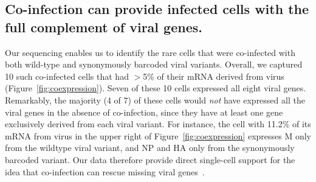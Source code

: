 \documentclass[9pt,lineno]{elife}
\begin{document}
\subsection{Co-infection can provide infected cells with the full complement of viral genes.}
Our sequencing enables us to identify the rare cells that were co-infected with both wild-type and synonymously barcoded viral variants.
Overall, we captured 10 such co-infected cells that had $>$5\% of their mRNA derived from virus (Figure~\ref{fig:coexpression}).
Seven of these 10 cells expressed all eight viral genes.
Remarkably, the majority (4 of 7) of these cells would \emph{not} have expressed all the viral genes in the absence of co-infection, since they have at least one gene exclusively derived from each viral variant.
For instance, the cell with 11.2\% of its mRNA from virus in the upper right of Figure~\ref{fig:coexpression} expresses M only from the wildtype viral variant, and NP and HA only from the synonymously barcoded variant.
Our data therefore provide direct single-cell support for the idea that co-infection can rescue missing viral genes~\citep{brooke2013most}.
\end{document}
